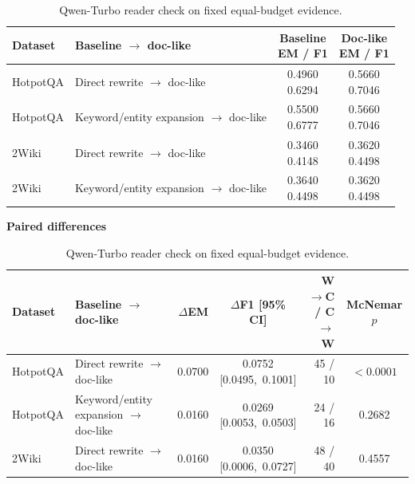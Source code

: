 \begin{table}[htbp]
\centering
\caption{Qwen-Turbo reader check on fixed equal-budget evidence.}
\label{tab:equal_budget_reader_check}
\footnotesize
\setlength{\tabcolsep}{3pt}
\renewcommand{\arraystretch}{1.08}

\begin{tabularx}{\textwidth}{@{}l>{\raggedright\arraybackslash}Xcc@{}}
\toprule
Dataset & Baseline $\rightarrow$ doc-like & \shortstack{Baseline\\EM / F1} & \shortstack{Doc-like\\EM / F1} \\
\midrule
HotpotQA & Direct rewrite $\rightarrow$ doc-like & \shortstack{0.4960\\0.6294} & \shortstack{0.5660\\0.7046} \\
HotpotQA & Keyword/entity expansion $\rightarrow$ doc-like & \shortstack{0.5500\\0.6777} & \shortstack{0.5660\\0.7046} \\
2Wiki & Direct rewrite $\rightarrow$ doc-like & \shortstack{0.3460\\0.4148} & \shortstack{0.3620\\0.4498} \\
2Wiki & Keyword/entity expansion $\rightarrow$ doc-like & \shortstack{0.3640\\0.4498} & \shortstack{0.3620\\0.4498} \\
\bottomrule
\end{tabularx}
\medskip\textbf{Paired differences}\par\smallskip
\begin{tabularx}{\textwidth}{@{}l>{\raggedright\arraybackslash}Xrcrc@{}}
\toprule
Dataset & Baseline $\rightarrow$ doc-like & $\Delta$EM & $\Delta$F1 [95\% CI] & \shortstack{W$\rightarrow$C /\\C$\rightarrow$W} & McNemar $p$ \\
\midrule
HotpotQA & Direct rewrite $\rightarrow$ doc-like & 0.0700 & \shortstack{0.0752\\\mbox{[0.0495, 0.1001]}} & 45 / 10 & $<0.0001$ \\
HotpotQA & Keyword/entity expansion $\rightarrow$ doc-like & 0.0160 & \shortstack{0.0269\\\mbox{[0.0053, 0.0503]}} & 24 / 16 & 0.2682 \\
2Wiki & Direct rewrite $\rightarrow$ doc-like & 0.0160 & \shortstack{0.0350\\\mbox{[0.0006, 0.0727]}} & 48 / 40 & 0.4557 \\

\end{tabularx}
\end{table}
